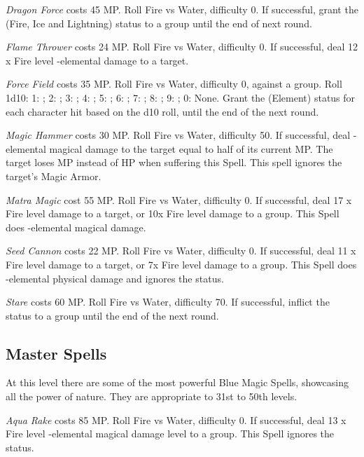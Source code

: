 \begin{multicols}{2}
    \textit{Dragon Force} costs 45 MP\@. Roll Fire vs Water, difficulty 0. If successful, grant the  (Fire, Ice and Lightning) status to a group until the end of next round.
    
    \textit{Flame Thrower} costs 24 MP\@. Roll Fire vs Water, difficulty 0. If successful, deal 12 x Fire level -elemental damage to a target.
    
	\textit{Force Field} costs 35 MP\@. Roll Fire vs Water, difficulty 0, against a group. Roll 1d10: 1: ; 2: ; 3: ; 4: ; 5: ; 6: ; 7: ; 8: ; 9: ; 0: None. Grant the (Element)  status for each character hit based on the d10 roll, until the end of the next round.
    
    \textit{Magic Hammer} costs 30 MP\@. Roll Fire vs Water, difficulty 50. If successful, deal -elemental magical damage to the target equal to half of its current MP\@. The target loses MP instead of HP when suffering this Spell. This spell ignores the target’s Magic Armor.
    
    \textit{Matra Magic} cost 55 MP\@. Roll Fire vs Water, difficulty 0. If successful, deal 17 x Fire level damage to a target, or 10x Fire level damage to a group. This Spell does -elemental magical damage.

    \textit{Seed Cannon} costs 22 MP\@. Roll Fire vs Water, difficulty 0. If successful, deal 11 x Fire level damage to a target, or 7x Fire level damage to a group. This Spell does -elemental physical damage and ignores the  status.
    
    \textit{Stare} costs 60 MP\@. Roll Fire vs Water, difficulty 70. If successful, inflict the  status to a group until the end of the next round.
    
\subsection{Master Spells}\label{subsec:blue-master}

	At this level there are some of the most powerful Blue Magic Spells, showcasing all the power of nature. They are appropriate to 31st to 50th levels.

    \textit{Aqua Rake} costs 85 MP\@. Roll Fire vs Water, difficulty 0. If successful, deal 13 x Fire level -elemental magical damage level to a group. This Spell ignores the  status.


\end{multicols}
